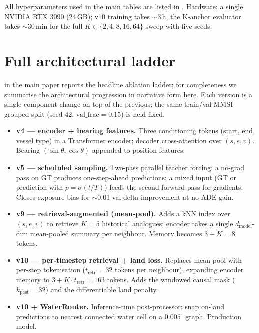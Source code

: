 \documentclass[11pt]{article}
\begin{document}
All hyperparameters used in the main tables are listed in
. Hardware: a single NVIDIA RTX 3090 (24\,GB);
v10 training takes $\sim$3\,h, the K-anchor evaluator takes
$\sim$30\,min for the full $K\!\in\!\{2,4,8,16,64\}$ sweep with five
seeds.




\appendix

\section{Full architectural ladder}
\label{sec:appendix-ladder}

 in the main paper reports the headline ablation
ladder; for completeness we summarise the architectural progression
in narrative form here. Each version is a single-component change on
top of the previous; the same train/val MMSI-grouped split (seed 42,
$\mathrm{val\_frac}=0.15$) is held fixed.

\begin{itemize}[leftmargin=*]
\item \textbf{v4 — encoder + bearing features.} Three conditioning
      tokens (start, end, vessel type) in a Transformer encoder;
      decoder cross-attention over $(s, e, v)$. Bearing
      $(\sin\theta, \cos\theta)$ appended to position features.
\item \textbf{v5 — scheduled sampling.} Two-pass parallel teacher
      forcing: a no-grad pass on GT produces one-step-ahead
      predictions; a mixed input (GT or prediction with
      $p=\sigma(t/T)$) feeds the second forward pass for gradients.
      Closes exposure bias for $\sim$0.01 val-delta improvement at no
      ADE gain.
\item \textbf{v9 — retrieval-augmented (mean-pool).} Adds a kNN index
      over $(s, e, v)$ to retrieve $K{=}5$ historical analogues;
      encoder takes a single $d_{\text{model}}$-dim mean-pooled summary
      per neighbour. Memory becomes $3 + K = 8$ tokens.
\item \textbf{v10 — per-timestep retrieval + land loss.} Replaces
      mean-pool with per-step tokenisation ($t_{\text{retr}}{=}32$
      tokens per neighbour), expanding encoder memory to
      $3 + K \cdot t_{\text{retr}} = 163$ tokens. Adds the windowed
      causal mask ($k_{\text{past}}{=}32$) and the differentiable
      land penalty.
\item \textbf{v10 + WaterRouter.} Inference-time post-processor: snap
      on-land predictions to nearest connected water cell on a
      $0.005^\circ$ graph. Production model.
\end{itemize}
\end{document}
